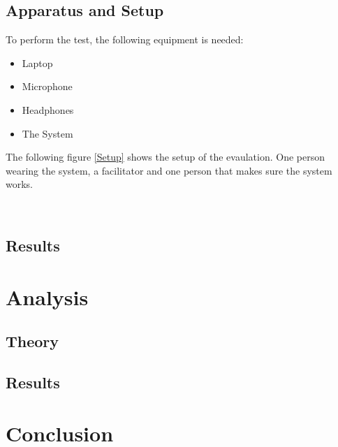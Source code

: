 \subsection{Apparatus and Setup}

To perform the test, the following equipment is needed:
\begin{itemize}
 \item Laptop
 \item Microphone
 \item Headphones
 \item The System
\end{itemize}

The following figure \ref{Setup} shows the setup of the evaulation. One person wearing the system, a facilitator and one person that makes sure the system works. 

\begin{minipage}{\linewidth}%
\label{Setup}
\end{minipage}\\

\subsection{Results}


\section{Analysis}

\subsection{Theory}

\subsection{Results}


\section{Conclusion}